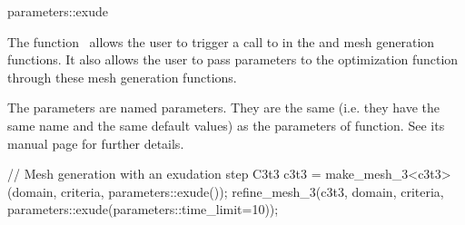 \ccRefPageBegin


\begin{ccRefFunction}{parameters::exude}  %


\ccDefinition
  
The function \ccRefName\ allows the user to trigger a call to  in the
 and  mesh generation functions.
It also allows the user to pass parameters
to the optimization function  through these mesh generation functions.




\ccParameters

The parameters are named parameters. They are the same (i.e. they have the same
name and the same default values) as the parameters of 
function. See its manual page for further details.




\ccExample

\begin{ccExampleCode}
// Mesh generation with an exudation step
C3t3 c3t3 = make_mesh_3<c3t3>(domain, criteria, parameters::exude());
refine_mesh_3(c3t3, domain, criteria, parameters::exude(parameters::time_limit=10));
\end{ccExampleCode}

\ccSeeAlso

 \\
 \\
 \\


\end{ccRefFunction}

\ccRefPageEnd

